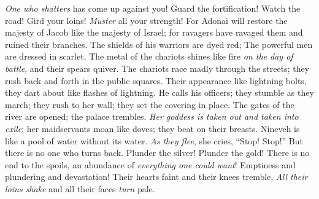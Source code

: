 \begin{biblechapter} %
 \textit{One who shatters} has come up against you! 
Guard the fortification! 
Watch the road! 
Gird your loins! 
\textit{Muster} all your strength!
\verse For Adonai will restore the majesty of Jacob 
like the majesty of Israel; 
for ravagers have ravaged them 
and ruined their branches.
 The shields of his warriors are dyed red; 
The powerful men are dressed in scarlet. 
The metal of the chariots shines like fire \textit{on the day of battle}, 
and their spears quiver.
\verse The chariots race madly through the streets; 
they rush back and forth in the public squares. 
Their appearance like lightning bolts, 
they dart about like flashes of lightning.
\verse He calls his officers; 
they stumble as they march; 
they rush to her wall; 
they set the covering in place.
\verse The gates of the river are opened; 
the palace trembles.
\verse \textit{Her goddess is taken out and taken into exile}; 
her maidservants moan like doves; 
they beat on their breasts.
\verse Nineveh is like a pool of water without its water. 
\textit{As they flee}, she cries, “Stop! Stop!” 
But there is no one who turns back.
\verse Plunder the silver! Plunder the gold! 
There is no end to the spoils, 
an abundance of \textit{everything one could want}!
\verse Emptiness and plundering and devastation! 
Their hearts faint and their knees tremble, 
\textit{All their loins shake} and all their faces \textit{turn} pale.

\end{biblechapter}
